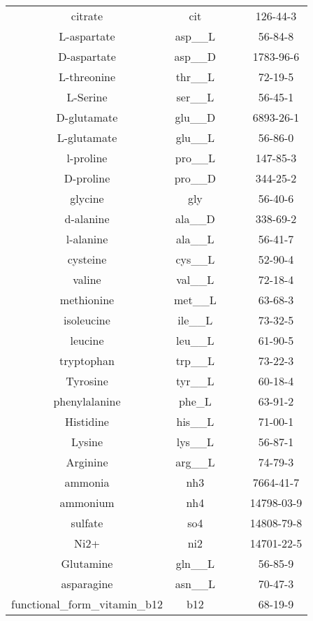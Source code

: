 \documentclass[../main.tex]{subfiles}
\begin{document}
\begin{table}[H]
\begin{adjustbox}{width=0.8\textwidth}
\begin{tabular}{|c|c|c|c|c|}
citrate &	cit &	\checkmark & &	126-44-3	\\
L-aspartate &	asp\_\_L &	\checkmark & &	56-84-8	\\
D-aspartate &	asp\_\_D &	\checkmark & &	1783-96-6	\\
L-threonine &	thr\_\_L &	\checkmark & &	72-19-5	\\
L-Serine &	ser\_\_L &	\checkmark & &	56-45-1	\\
D-glutamate &	glu\_\_D &	\checkmark & &	6893-26-1	\\
L-glutamate &	glu\_\_L &	\checkmark & &	56-86-0	\\
l-proline &	pro\_\_L &	\checkmark & &	147-85-3	\\
D-proline &	pro\_\_D &	\checkmark & &	344-25-2	\\
glycine &	gly &	\checkmark & &	56-40-6	\\
d-alanine &	ala\_\_D &	\checkmark & &	338-69-2	\\
l-alanine &	ala\_\_L &	\checkmark & &	56-41-7	\\
cysteine &	cys\_\_L &	\checkmark & &	52-90-4	\\
valine &	val\_\_L &	\checkmark & &	72-18-4	\\
methionine &	met\_\_L &	\checkmark & &	63-68-3	\\
isoleucine &	ile\_\_L &	\checkmark & &	73-32-5	\\
leucine &	leu\_\_L &	\checkmark & &	61-90-5	\\
tryptophan &	trp\_\_L &	\checkmark & &	73-22-3	\\
Tyrosine &	tyr\_\_L &	\checkmark & &	60-18-4	\\
phenylalanine &	phe\_L &	\checkmark & &	63-91-2	\\
Histidine &	his\_\_L &	\checkmark & &	71-00-1	\\
Lysine &	lys\_\_L &	\checkmark & &	56-87-1	\\
Arginine &	arg\_\_L &	\checkmark & &	74-79-3	\\
ammonia &	nh3 &	\checkmark & &	7664-41-7	\\
ammonium &	nh4 &	\checkmark & &	14798-03-9	\\
sulfate &	so4 &	\checkmark & &	14808-79-8	\\
Ni2+ &	ni2 &	\checkmark & &	14701-22-5	\\
Glutamine &	gln\_\_L &	\checkmark & &	56-85-9	\\
asparagine &	asn\_\_L &	\checkmark & &	70-47-3	\\
functional\_form\_vitamin\_b12 &	b12 &	\checkmark & &	68-19-9	\\

\end{tabular}
\end{adjustbox}
\end{table}
\end{document}
